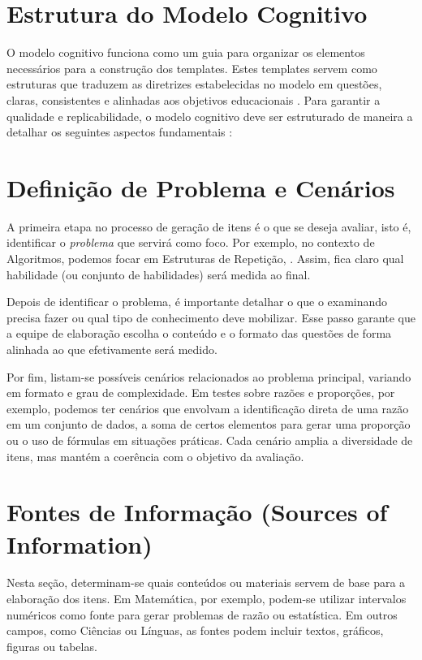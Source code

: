 \section{Estrutura do Modelo Cognitivo}

O modelo cognitivo funciona como um guia para organizar os elementos necessários para a construção dos templates. Estes templates servem como estruturas que traduzem as diretrizes estabelecidas no modelo em questões, claras, consistentes e alinhadas aos objetivos educacionais \parencite{keehner2017, gierl2017}. Para garantir a qualidade e replicabilidade, o modelo cognitivo deve ser estruturado de maneira a detalhar os seguintes aspectos fundamentais : 

\section{Definição de Problema e Cenários}

A primeira etapa no processo de geração de itens é o que se deseja avaliar, isto é, identificar o \emph{problema} que servirá como foco. Por exemplo, no contexto de Algoritmos, podemos focar em Estruturas de Repetição, . Assim, fica claro qual habilidade (ou conjunto de habilidades) será medida ao final.

Depois de identificar o problema, é importante detalhar o que o examinando precisa fazer ou qual tipo de conhecimento deve mobilizar. Esse passo garante que a equipe de elaboração escolha o conteúdo e o formato das questões de forma alinhada ao que efetivamente será medido.

Por fim, listam-se possíveis cenários relacionados ao problema principal, variando em formato e grau de complexidade. Em testes sobre razões e proporções, por exemplo, podemos ter cenários que envolvam a identificação direta de uma razão em um conjunto de dados, a soma de certos elementos para gerar uma proporção ou o uso de fórmulas em situações práticas. Cada cenário amplia a diversidade de itens, mas mantém a coerência com o objetivo da avaliação.

\section{Fontes de Informação (Sources of Information)}
Nesta seção, determinam-se quais conteúdos ou materiais servem de base para a elaboração dos itens. Em Matemática, por exemplo, podem-se utilizar intervalos numéricos como fonte para gerar problemas de razão ou estatística. Em outros campos, como Ciências ou Línguas, as fontes podem incluir textos, gráficos, figuras ou tabelas.

